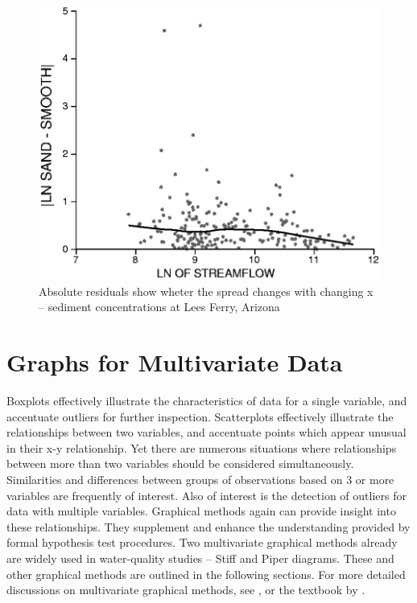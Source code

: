 \documentclass[]{book}
\begin{document}
\begin{figure}

{\centering \includegraphics[width=12.14in]{figures/2_29} 

}

\caption{Absolute residuals show wheter the spread changes with changing x -- sediment concentrations at Lees Ferry, Arizona}\label{fig:fig-2-29}
\end{figure}

\hypertarget{graphs-for-multivariate-data}{%
\section{Graphs for Multivariate Data}\label{graphs-for-multivariate-data}}

Boxplots effectively illustrate the characteristics of data for a single variable, and accentuate outliers for further inspection. Scatterplots effectively illustrate the relationships between two variables, and accentuate points which appear unusual in their x-y relationship. Yet there are numerous situations where relationships between more than two variables should be considered simultaneously. Similarities and differences between groups of observations based on 3 or more variables are frequently of interest. Also of interest is the detection of outliers for data with multiple variables. Graphical methods again can provide insight into these relationships. They supplement and enhance the understanding provided by formal hypothesis test procedures. Two multivariate graphical methods already are widely used in water-quality studies -- Stiff and Piper diagrams. These and other graphical methods are outlined in the following sections. For more detailed discussions on multivariate graphical methods, see \citet{chambers_graphical_1983}, or the textbook by \citet{everitt_graphical_1978}.
\end{document}
